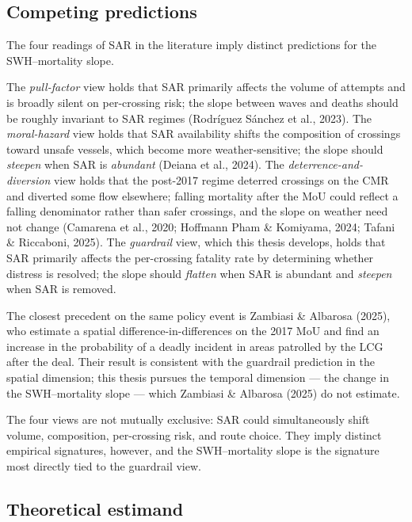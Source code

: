 \documentclass[
  11pt,
  a4paper,
]{article}
\begin{document}
\subsection{Competing predictions}\label{competing-predictions}

The four readings of SAR in the literature imply distinct predictions
for the SWH--mortality slope.

The \emph{pull-factor} view holds that SAR primarily affects the volume
of attempts and is broadly silent on per-crossing risk; the slope
between waves and deaths should be roughly invariant to SAR regimes
(Rodríguez Sánchez et al., 2023). The \emph{moral-hazard} view holds
that SAR availability shifts the composition of crossings toward unsafe
vessels, which become more weather-sensitive; the slope should
\emph{steepen} when SAR is \emph{abundant} (Deiana et al., 2024). The
\emph{deterrence-and-diversion} view holds that the post-2017 regime
deterred crossings on the CMR and diverted some flow elsewhere; falling
mortality after the MoU could reflect a falling denominator rather than
safer crossings, and the slope on weather need not change (Camarena et
al., 2020; Hoffmann Pham \& Komiyama, 2024; Tafani \& Riccaboni, 2025).
The \emph{guardrail} view, which this thesis develops, holds that SAR
primarily affects the per-crossing fatality rate by determining whether
distress is resolved; the slope should \emph{flatten} when SAR is
abundant and \emph{steepen} when SAR is removed.

The closest precedent on the same policy event is Zambiasi \& Albarosa
(2025), who estimate a spatial difference-in-differences on the 2017 MoU
and find an increase in the probability of a deadly incident in areas
patrolled by the LCG after the deal. Their result is consistent with the
guardrail prediction in the spatial dimension; this thesis pursues the
temporal dimension --- the change in the SWH--mortality slope --- which
Zambiasi \& Albarosa (2025) do not estimate.

The four views are not mutually exclusive: SAR could simultaneously
shift volume, composition, per-crossing risk, and route choice. They
imply distinct empirical signatures, however, and the SWH--mortality
slope is the signature most directly tied to the guardrail view.

\subsection{Theoretical estimand}\label{theoretical-estimand}
\end{document}
